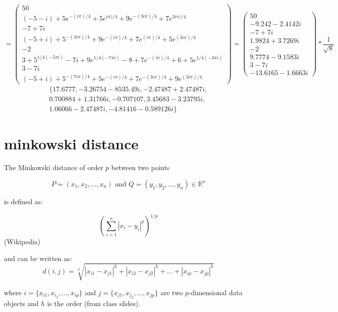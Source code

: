 \documentclass{article}
\begin{document}
\[
	=
	\begin{pmatrix}
	  50 \\
	  (-5-i)+5 e^{-(i \pi)/4}+5 e^{ i \pi)/4}+9 e^{-(3 i \pi)/4}+7 e^{3 i \pi)/4} \\
	  -7 + 7i \\
	  (-5+i)+5^{-(3 i \pi)/4}+9 e^{-(i \pi)/4}+7 e^{(i \pi)/4}+5 e^{(3 i \pi)/4} \\
	  -2 \\
	  3+5^{1/4 (-5 \pi i)}-7 i+9 e^{1/4 (-7 \pi i)}-8+7 e^{-(\pi i)/4}+6+5 e^{1/4 (-3 \pi i)} \\
	  3 - 7i \\
	  (-5+i)+5^{-(7 i \pi)/4}+5 e^{-(i \pi)/4}+7 e^{-(3 i \pi)/4}+9 e^{(3 i \pi)/4}

	\end{pmatrix}
	=
	\begin{pmatrix}
	  50 \\
	  -9.242 - 2.4142 i \\
	  -7 + 7i \\
	  1.9824 + 3.7269 i \\
	  -2 \\
	  9.7774 - 9.1583 i \\
	  3 - 7i \\
	  -13.6165 - 1.6663 i

	\end{pmatrix}
	*
   \frac{1}{\sqrt{8}} 
\]
\begin{align*}
  \{ 17.6777, -3.26754-8535.49 i, -2.47487+2.47487 i,\\
  0.700884+1.31766 i, -0.707107, 3.45683-3.23795 i, \\
  1.06066-2.47487 i, -4.81416-0.589126 i \}
\end{align*}

\section{minkowski distance}

The Minkowski distance of order $p$ between two points

 \[ P =(x_1,x_2,\ldots,x_n)\text{ and }Q=(y_1,y_2,\ldots,y_n) \in \mathbb{R}^n
 \]

is defined as:

\[ \left(\sum_{i=1}^n |x_i-y_i|^p\right)^{1/p} \]
(Wikipedia)

and can be written as:
\[d(i,j) = \sqrt[h]{|x_{i1} - x_{j1}|^h +  |x_{i2} - x_{j2}|^h + \dots + | x_{ip} - x_{jp}|^h } \] 

where $i = \{x_{i1}, x_{i_2}, \ldots, x_{ip} \}$ and  $j = \{x_{j1}, x_{j_2},
\ldots, x_{jp} \} $ are two $p$-dimensional data objects and $h$ is the order
(from class slides). 
	
\end{document}
